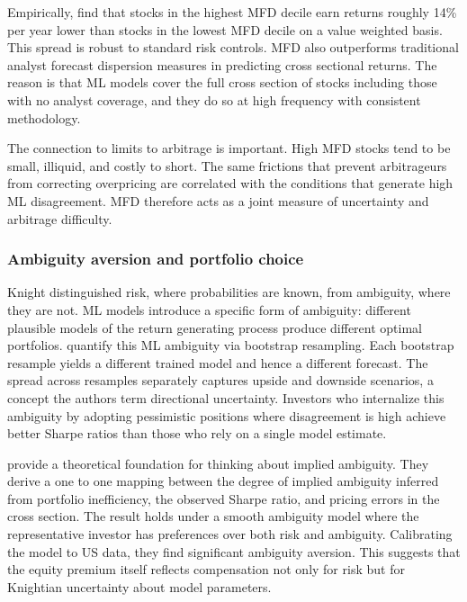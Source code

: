 Empirically, \cite{bali2025disagreement} find that stocks in the highest MFD decile earn returns roughly 14\% per year lower than stocks in the lowest MFD decile on a value weighted basis. This spread is robust to standard risk controls. MFD also outperforms traditional analyst forecast dispersion measures in predicting cross sectional returns. The reason is that ML models cover the full cross section of stocks including those with no analyst coverage, and they do so at high frequency with consistent methodology.

The connection to limits to arbitrage is important. High MFD stocks tend to be small, illiquid, and costly to short. The same frictions that prevent arbitrageurs from correcting overpricing are correlated with the conditions that generate high ML disagreement. MFD therefore acts as a joint measure of uncertainty and arbitrage difficulty.

\subsubsection{Ambiguity aversion and portfolio choice}\label{sec_ambiguity}

Knight distinguished risk, where probabilities are known, from ambiguity, where they are not. ML models introduce a specific form of ambiguity: different plausible models of the return generating process produce different optimal portfolios. \cite{ghysels2022ambiguity} quantify this ML ambiguity via bootstrap resampling. Each bootstrap resample yields a different trained model and hence a different forecast. The spread across resamples separately captures upside and downside scenarios, a concept the authors term directional uncertainty. Investors who internalize this ambiguity by adopting pessimistic positions where disagreement is high achieve better Sharpe ratios than those who rely on a single model estimate.

\cite{hara2022ambiguity} provide a theoretical foundation for thinking about implied ambiguity. They derive a one to one mapping between the degree of implied ambiguity inferred from portfolio inefficiency, the observed Sharpe ratio, and pricing errors in the cross section. The result holds under a smooth ambiguity model where the representative investor has preferences over both risk and ambiguity. Calibrating the model to US data, they find significant ambiguity aversion. This suggests that the equity premium itself reflects compensation not only for risk but for Knightian uncertainty about model parameters.

